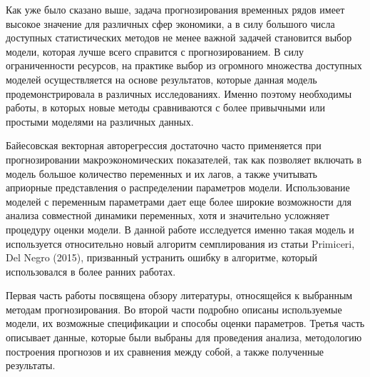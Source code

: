 Как уже было сказано выше, задача прогнозирования временных рядов имеет высокое значение для различных сфер экономики, а в силу большого числа доступных статистических методов не менее важной задачей становится выбор модели, которая лучше всего справится с прогнозированием. В силу ограниченности ресурсов, на практике выбор из огромного множества доступных моделей осуществляется на основе результатов, которые данная модель продемонстрировала в различных исследованиях. Именно поэтому необходимы работы, в которых новые методы сравниваются с более привычными или простыми моделями на различных данных.

Байесовская векторная авторегрессия достаточно часто применяется при прогнозировании макроэкономических показателей, так как позволяет включать в модель большое количество переменных и их лагов, а также учитывать априорные представления о распределении параметров модели. Использование моделей с переменным параметрами дает еще более широкие возможности для анализа совместной динамики переменных, хотя и значительно усложняет процедуру оценки модели. В данной работе исследуется именно такая модель и используется относительно новый алгоритм семплирования из статьи Primiceri, Del Negro (2015), призванный устранить ошибку в алгоритме, который использовался в более ранних работах.

Первая часть работы посвящена обзору литературы, относящейся к выбранным методам прогнозирования. Во второй части подробно описаны используемые модели, их возможные спецификации и способы оценки параметров. Третья часть описывает данные, которые были выбраны для проведения анализа, методологию построения прогнозов и их сравнения между собой, а также полученные результаты.
